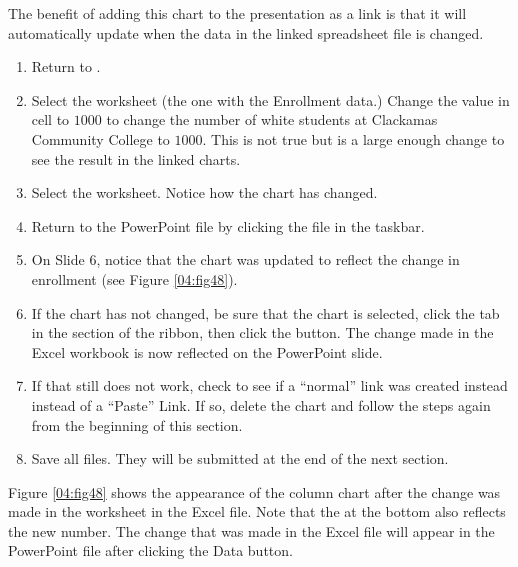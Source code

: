 The benefit of adding this chart to the presentation as a link is that it will automatically update when the data in the linked spreadsheet file is changed.

\begin{enumerate}
	\item Return to .
	\item Select the  worksheet (the one with the Enrollment data.) Change the value in cell  to $ 1000 $ to change the number of white students at Clackamas Community College to $ 1000 $. This is not true but is a large enough change to see the result in the linked charts.
	\item Select the  worksheet. Notice how the chart has changed.
	\item Return to the  PowerPoint file by clicking the file in the taskbar.
	\item On Slide $ 6 $, notice that the chart was updated to reflect the change in enrollment (see Figure \ref{04:fig48}).
	\item If the chart has not changed, be sure that the chart is selected, click the  tab in the  section of the ribbon, then click the  button. The change made in the Excel workbook is now reflected on the PowerPoint slide.
	\item If that still does not work, check to see if a ``normal'' link was created instead instead of a ``Paste'' Link. If so, delete the chart and follow the steps again from the beginning of this section.
	\item Save all files. They will be submitted at the end of the next section.
\end{enumerate}

Figure \ref{04:fig48} shows the appearance of the column chart after the change was made in the  worksheet in the Excel file. Note that the  at the bottom also reflects the new number. The change that was made in the Excel file will appear in the PowerPoint file after clicking the Data button.

